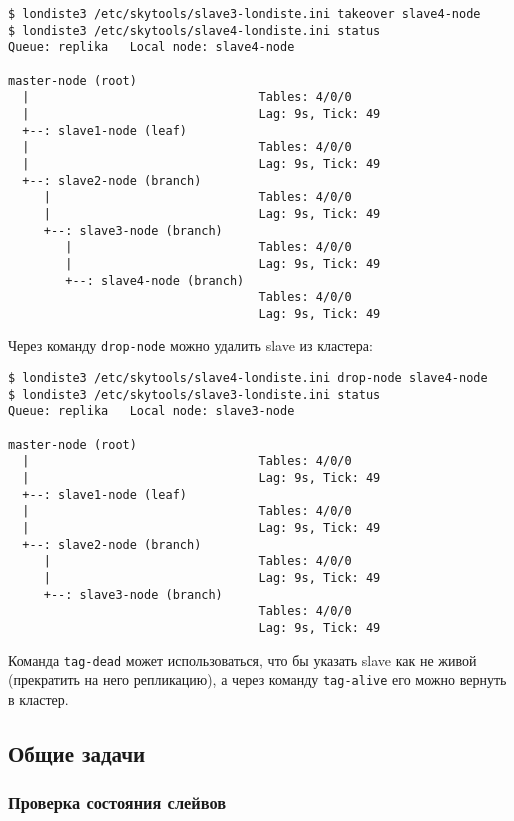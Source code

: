 \begin{lstlisting}[label=lst:londiste-cascade8,caption=Изменяем топологию]
$ londiste3 /etc/skytools/slave3-londiste.ini takeover slave4-node
$ londiste3 /etc/skytools/slave4-londiste.ini status
Queue: replika   Local node: slave4-node

master-node (root)
  |                                Tables: 4/0/0
  |                                Lag: 9s, Tick: 49
  +--: slave1-node (leaf)
  |                                Tables: 4/0/0
  |                                Lag: 9s, Tick: 49
  +--: slave2-node (branch)
     |                             Tables: 4/0/0
     |                             Lag: 9s, Tick: 49
     +--: slave3-node (branch)
        |                          Tables: 4/0/0
        |                          Lag: 9s, Tick: 49
        +--: slave4-node (branch)
                                   Tables: 4/0/0
                                   Lag: 9s, Tick: 49
\end{lstlisting}

Через команду \lstinline!drop-node! можно удалить slave из кластера:

\begin{lstlisting}[label=lst:londiste-cascade9,caption=Удаляем ноду]
$ londiste3 /etc/skytools/slave4-londiste.ini drop-node slave4-node
$ londiste3 /etc/skytools/slave3-londiste.ini status
Queue: replika   Local node: slave3-node

master-node (root)
  |                                Tables: 4/0/0
  |                                Lag: 9s, Tick: 49
  +--: slave1-node (leaf)
  |                                Tables: 4/0/0
  |                                Lag: 9s, Tick: 49
  +--: slave2-node (branch)
     |                             Tables: 4/0/0
     |                             Lag: 9s, Tick: 49
     +--: slave3-node (branch)
                                   Tables: 4/0/0
                                   Lag: 9s, Tick: 49
\end{lstlisting}

Команда \lstinline!tag-dead! может использоваться, что бы указать slave как не живой (прекратить на него репликацию), а через команду \lstinline!tag-alive! его можно вернуть в кластер.




\subsection{Общие задачи}

\subsubsection{Проверка состояния слейвов}

